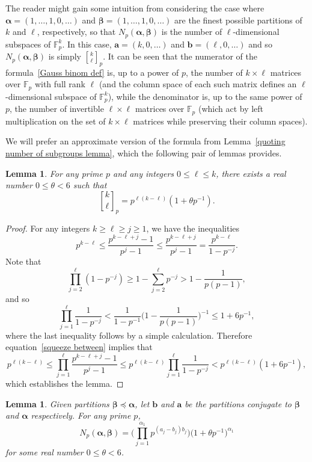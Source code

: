 \documentclass[12pt,reqno]{amsart}
\newtheorem{lemma}[theorem]{Lemma}
\theoremstyle{definition}
\newcommand{\gbinom}[2]{\genfrac{[}{]}{0pt}{}{#1}{#2}}
\newcommand{\F}{{\mathbb F}}
\newcommand{\ba}{{\bm a}}
\newcommand{\bb}{{\bm b}}
\newcommand{\balpha}{{\bm\alpha}}
\newcommand{\bbeta}{{\bm\beta}}
\begin{document}
The reader might gain some intuition from considering the case where $\balpha=(1,\dots,1,0,\dots)$ and $\bbeta=(1,\dots,1,0,\dots)$ are the finest possible partitions of $k$ and $\ell$, respectively, so that $N_p(\balpha,\bbeta)$ is the number of $\ell$-dimensional subspaces of $\F_p^k$. In this case, $\ba=(k,0,\dots)$ and $\bb=(\ell,0,\dots)$ and so $N_p(\balpha,\bbeta)$ is simply $\gbinom k\ell_p$. It can be seen that the numerator of the formula~\eqref{Gauss binom def} is, up to a power of $p$, the number of $k\times\ell$ matrices over $\F_p$ with full rank $\ell$ (and the column space of each such matrix defines an $\ell$-dimensional subspace of $\F_p^k$), while the denominator is, up to the same power of $p$, the number of invertible $\ell\times\ell$ matrices over $\F_p$ (which act by left multiplication on the set of $k\times\ell$ matrices while preserving their column spaces).

We will prefer an approximate version of the formula from Lemma~\ref{quoting number of subgroups lemma}, which the following pair of lemmas provides.

\begin{lemma}
\label{gaussian binomial estimate lemma}
For any prime $p$ and any integers $0\le \ell\le k$, there exists a real number $0\le \theta < 6$ such that
\[
\gbinom k\ell_p = p^{\ell(k-\ell)} (1+\theta p^{-1}).
\]
\end{lemma}

\begin{proof}
For any integers $k\ge \ell\ge j\ge1$, we have the inequalities
\begin{equation}
\label{squeeze between}
p^{k-\ell} \le \frac{p^{k-\ell+j}-1}{p^j-1} \le \frac{p^{k-\ell+j}}{p^j-1} = \frac{p^{k-\ell}}{1-p^{-j}}.
\end{equation}
Note that
\[
\prod_{j=2}^\ell (1-p^{-j}) \ge 1-\sum_{j=2}^\ell p^{-j} > 1-\frac1{p(p-1)},
\]
and so
\[
\prod_{j=1}^\ell \frac1 {1-p^{-j}} < \frac1{1-p^{-1}} \bigg( 1-\frac1{p(p-1)} \bigg)^{-1} \le 1+6p^{-1},
\]
where the last inequality follows by a simple calculation. Therefore equation~\eqref{squeeze between} implies that
\begin{equation*}
p^{\ell(k-\ell)} \le \prod_{j=1}^\ell \frac{p^{k-\ell+j}-1}{p^j-1} \le p^{\ell(k-\ell)} \prod_{j=1}^\ell \frac1 {1-p^{-j}} < p^{\ell(k-\ell)} (1+6p^{-1}),
\end{equation*}
which establishes the lemma.
\end{proof}

\begin{lemma}
\label{subgroups fixed type lemma}
Given partitions $\bbeta \preceq \balpha$, let $\bb$ and $\ba$ be the partitions conjugate to $\bbeta$ and $\balpha$ respectively. For any prime $p$, 
\[
N_p(\balpha,\bbeta) = \bigg( \prod_{j=1}^{\alpha_1} p^{(a_j-b_j)b_j} \bigg) \big( 1+\theta p^{-1} \big)^{\alpha_1}
\]
for some real number $0\le \theta < 6$.
\end{lemma}
\end{document}
